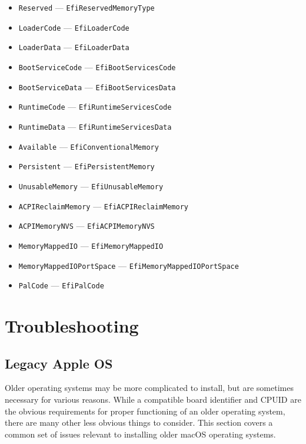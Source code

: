 \documentclass[]{article}
\providecommand{\tightlist}{%
  \setlength{\itemsep}{0pt}\setlength{\parskip}{0pt}}
\begin{document}
\begin{enumerate}
  \begin{itemize}
    \tightlist
    \item \texttt{Reserved} --- \texttt{EfiReservedMemoryType}
    \item \texttt{LoaderCode} --- \texttt{EfiLoaderCode}
    \item \texttt{LoaderData} --- \texttt{EfiLoaderData}
    \item \texttt{BootServiceCode} --- \texttt{EfiBootServicesCode}
    \item \texttt{BootServiceData} --- \texttt{EfiBootServicesData}
    \item \texttt{RuntimeCode} --- \texttt{EfiRuntimeServicesCode}
    \item \texttt{RuntimeData} --- \texttt{EfiRuntimeServicesData}
    \item \texttt{Available} --- \texttt{EfiConventionalMemory}
    \item \texttt{Persistent} --- \texttt{EfiPersistentMemory}
    \item \texttt{UnusableMemory} --- \texttt{EfiUnusableMemory}
    \item \texttt{ACPIReclaimMemory} --- \texttt{EfiACPIReclaimMemory}
    \item \texttt{ACPIMemoryNVS} --- \texttt{EfiACPIMemoryNVS}
    \item \texttt{MemoryMappedIO} --- \texttt{EfiMemoryMappedIO}
    \item \texttt{MemoryMappedIOPortSpace} --- \texttt{EfiMemoryMappedIOPortSpace}
    \item \texttt{PalCode} --- \texttt{EfiPalCode}
  \end{itemize}

\end{enumerate}

\section{Troubleshooting}\label{troubleshooting}

\subsection{Legacy Apple OS}\label{legacyapple}

Older operating systems may be more complicated to install, but are sometimes
necessary for various reasons. While a compatible board identifier
and CPUID are the obvious requirements for proper functioning of an older
operating system, there are many other less obvious things to consider.
This section covers a common set of issues relevant to installing
older macOS operating systems.
\end{document}
